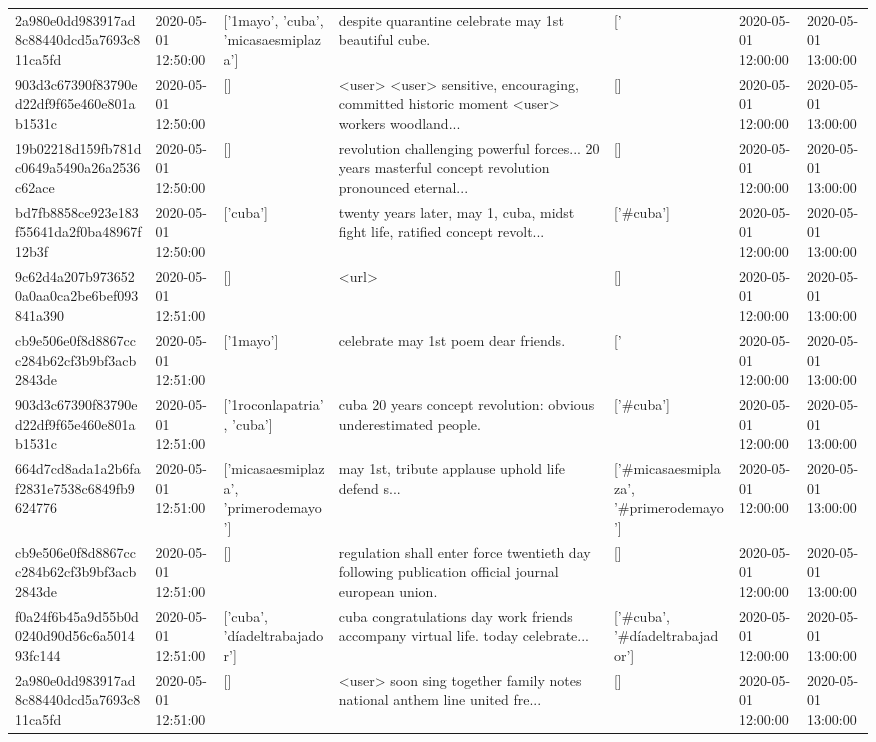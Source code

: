 \begin{tabular}{lllllll}
2a980e0dd983917ad8c88440dcd5a7693c811ca5fd & 2020-05-01 12:50:00 & ['1mayo', 'cuba', 'micasaesmiplaza'] & despite quarantine celebrate may 1st beautiful cube. & ['#1mayo', '#cuba', '#micasaesmiplaza'] & 2020-05-01 12:00:00 & 2020-05-01 13:00:00 \\
903d3c67390f83790ed22df9f65e460e801ab1531c & 2020-05-01 12:50:00 & [] & <user> <user> sensitive, encouraging, committed historic moment <user> workers woodland... & [] & 2020-05-01 12:00:00 & 2020-05-01 13:00:00 \\
19b02218d159fb781dc0649a5490a26a2536c62ace & 2020-05-01 12:50:00 & [] & revolution challenging powerful forces... 20 years masterful concept revolution pronounced eternal... & [] & 2020-05-01 12:00:00 & 2020-05-01 13:00:00 \\
bd7fb8858ce923e183f55641da2f0ba48967f12b3f & 2020-05-01 12:50:00 & ['cuba'] & twenty years later, may 1, cuba, midst fight life, ratified concept revolt... & ['#cuba'] & 2020-05-01 12:00:00 & 2020-05-01 13:00:00 \\
9c62d4a207b9736520a0aa0ca2be6bef093841a390 & 2020-05-01 12:51:00 & [] & <url> & [] & 2020-05-01 12:00:00 & 2020-05-01 13:00:00 \\
cb9e506e0f8d8867ccc284b62cf3b9bf3acb2843de & 2020-05-01 12:51:00 & ['1mayo'] & celebrate may 1st poem dear friends. & ['#1mayo'] & 2020-05-01 12:00:00 & 2020-05-01 13:00:00 \\
903d3c67390f83790ed22df9f65e460e801ab1531c & 2020-05-01 12:51:00 & ['1roconlapatria', 'cuba'] & cuba 20 years concept revolution: obvious underestimated people. & ['#cuba'] & 2020-05-01 12:00:00 & 2020-05-01 13:00:00 \\
664d7cd8ada1a2b6faf2831e7538c6849fb9624776 & 2020-05-01 12:51:00 & ['micasaesmiplaza', 'primerodemayo'] & may 1st, tribute applause uphold life defend s... & ['#micasaesmiplaza', '#primerodemayo'] & 2020-05-01 12:00:00 & 2020-05-01 13:00:00 \\
cb9e506e0f8d8867ccc284b62cf3b9bf3acb2843de & 2020-05-01 12:51:00 & [] & regulation shall enter force twentieth day following publication official journal european union. & [] & 2020-05-01 12:00:00 & 2020-05-01 13:00:00 \\
f0a24f6b45a9d55b0d0240d90d56c6a501493fc144 & 2020-05-01 12:51:00 & ['cuba', 'díadeltrabajador'] & cuba congratulations day work friends accompany virtual life. today celebrate... & ['#cuba', '#díadeltrabajador'] & 2020-05-01 12:00:00 & 2020-05-01 13:00:00 \\
2a980e0dd983917ad8c88440dcd5a7693c811ca5fd & 2020-05-01 12:51:00 & [] & <user> soon sing together family notes national anthem line united fre... & [] & 2020-05-01 12:00:00 & 2020-05-01 13:00:00 \\

\end{tabular}
